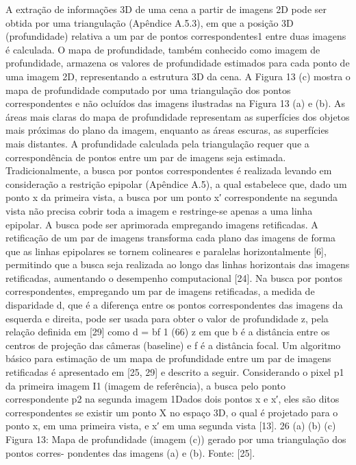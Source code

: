 A extração de informações 3D de uma cena a partir de imagens 2D pode ser obtida por uma triangulação (Apêndice A.5.3), em que a posição 3D (profundidade) relativa a um par de pontos correspondentes1 entre duas imagens é calculada. O mapa de profundidade, também conhecido como imagem de profundidade, armazena os valores de profundidade estimados para cada ponto de uma imagem 2D, representando a estrutura 3D da cena. A Figura 13 (c) mostra o mapa de profundidade computado por uma triangulação dos pontos correspondentes e não ocluídos das imagens ilustradas na Figura 13 (a) e (b). As áreas mais claras do mapa de profundidade representam as superfícies dos objetos mais próximas do plano da imagem, enquanto as áreas escuras, as superfícies mais distantes.
A profundidade calculada pela triangulação requer que a correspondência de pontos entre um par de imagens seja estimada. Tradicionalmente, a busca por pontos correspondentes é realizada levando em consideração a restrição epipolar (Apêndice A.5), a qual estabelece que, dado um ponto x da primeira vista, a busca por um ponto x′ correspondente na segunda vista não precisa cobrir toda a imagem e restringe-se apenas a uma linha epipolar. A busca pode ser aprimorada empregando imagens retificadas. A retificação de um par de imagens transforma cada plano das imagens de forma que as linhas epipolares se tornem colineares e paralelas horizontalmente [6], permitindo que a busca seja realizada ao longo das linhas horizontais das imagens retificadas, aumentando o desempenho computacional [24].
Na busca por pontos correspondentes, empregando um par de imagens retificadas, a medida de disparidade d, que é a diferença entre os pontos correspondentes das imagens da esquerda e direita, pode ser usada para obter o valor de profundidade z, pela relação definida em [29] como
d = bf 1 (66) z
em que b é a distância entre os centros de projeção das câmeras (baseline) e f é a distância focal. Um algoritmo básico para estimação de um mapa de profundidade entre um par de imagens retificadas é apresentado em [25, 29] e descrito a seguir. Considerando o pixel p1 da primeira imagem I1 (imagem de referência), a busca pelo ponto correspondente p2 na segunda imagem
1Dados dois pontos x e x′, eles são ditos correspondentes se existir um ponto X no espaço 3D, o qual é projetado para o ponto x, em uma primeira vista, e x′ em uma segunda vista [13].
  26
   (a) (b) (c)
Figura 13: Mapa de profundidade (imagem (c)) gerado por uma triangulação dos pontos corres- pondentes das imagens (a) e (b). Fonte: [25].
